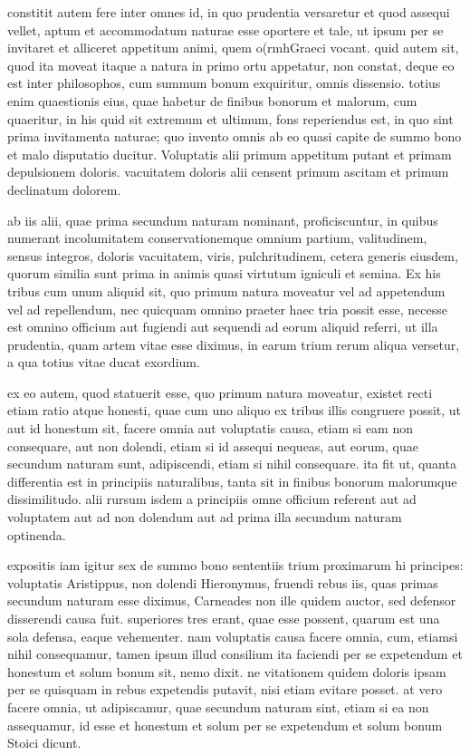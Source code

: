  constitit autem fere inter omnes id, in quo prudentia versaretur et quod assequi vellet, aptum et accommodatum naturae esse oportere et tale, ut ipsum per se invitaret et alliceret appetitum animi, quem o(rmh\n Graeci vocant. quid autem sit, quod ita moveat itaque a natura in primo ortu appetatur, non constat, deque eo est inter philosophos, cum summum bonum exquiritur, omnis dissensio. totius enim quaestionis eius, quae habetur de finibus bonorum et malorum, cum quaeritur, in his quid sit extremum et ultimum, fons reperiendus est, in quo sint prima invitamenta naturae; quo invento omnis ab eo quasi capite de summo bono et malo disputatio ducitur. Voluptatis alii primum appetitum putant et primam depulsionem doloris. vacuitatem doloris alii censent primum ascitam et primum declinatum dolorem.

 ab iis alii, quae prima secundum naturam nominant, proficiscuntur, in quibus numerant incolumitatem conservationemque omnium partium, valitudinem, sensus integros, doloris vacuitatem, viris, pulchritudinem, cetera generis eiusdem, quorum similia sunt prima in animis quasi virtutum igniculi et semina. Ex his tribus cum unum aliquid sit, quo primum natura moveatur vel ad appetendum vel ad repellendum, nec quicquam omnino praeter haec tria possit esse, necesse est omnino officium aut fugiendi aut sequendi ad eorum aliquid referri, ut illa prudentia, quam artem vitae esse diximus, in earum trium rerum aliqua versetur, a qua totius vitae ducat exordium.

 ex eo autem, quod statuerit esse, quo primum natura moveatur, existet recti etiam ratio atque honesti, quae cum uno aliquo ex tribus illis congruere possit, ut aut id honestum sit, facere omnia aut voluptatis causa, etiam si eam non consequare, aut non dolendi, etiam si id assequi nequeas, aut eorum, quae secundum naturam sunt, adipiscendi, etiam si nihil consequare. ita fit ut, quanta differentia est in principiis naturalibus, tanta sit in finibus bonorum malorumque dissimilitudo. alii rursum isdem a principiis omne officium referent aut ad voluptatem aut ad non dolendum aut ad prima illa secundum naturam optinenda.

 expositis iam igitur sex de summo bono sententiis trium proximarum hi principes: voluptatis Aristippus, non dolendi Hieronymus, fruendi rebus iis, quas primas secundum naturam esse diximus, Carneades non ille quidem auctor, sed defensor disserendi causa fuit. superiores tres erant, quae esse possent, quarum est una sola defensa, eaque vehementer. nam voluptatis causa facere omnia, cum, etiamsi nihil consequamur, tamen ipsum illud consilium ita faciendi per se expetendum et honestum et solum bonum sit, nemo dixit. ne vitationem quidem doloris ipsam per se quisquam in rebus expetendis putavit, nisi etiam evitare posset. at vero facere omnia, ut adipiscamur, quae secundum naturam sint, etiam si ea non assequamur, id esse et honestum et solum per se expetendum et solum bonum Stoici dicunt.

